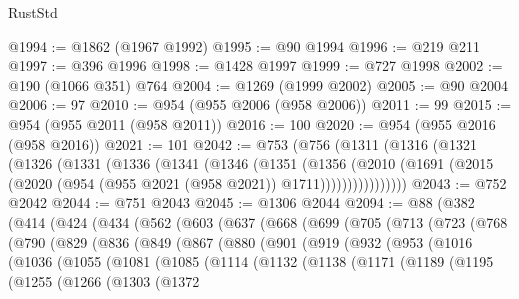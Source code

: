 \begin{lexlean}{RustStd}
\begin{coremodule}
{\begin{coremodule}
{{{{{{{{{{{{{{{{{{{{{{{{{{{{{{{{{{{{{{{{{{{{{{{{{{@1994 := @1862 (@1967 @1992)
@1995 := @90 @1994
@1996 := @219 @211
@1997 := @396 @1996
@1998 := @1428 @1997
@1999 := @727 @1998
@2002 := @190 (@1066 @351) @764
@2004 := @1269 (@1999 @2002)
@2005 := @90 @2004
@2006 := 97
@2010 := @954 (@955 @2006 (@958 @2006))
@2011 := 99
@2015 := @954 (@955 @2011 (@958 @2011))
@2016 := 100
@2020 := @954 (@955 @2016 (@958 @2016))
@2021 := 101
@2042 := @753
    (@756
      (@1311
        (@1316
          (@1321
            (@1326
              (@1331
                (@1336
                  (@1341
                    (@1346
                      (@1351
                        (@1356
                          (@2010
                            (@1691
                              (@2015 (@2020 (@954 (@955 @2021 (@958 @2021)) @1711))))))))))))))))
@2043 := @752 @2042
@2044 := @751 @2043
@2045 := @1306 @2044
@2094 := @88
    (@382
      (@414
        (@424
          (@434
            (@562
              (@603
                (@637
                  (@668
                    (@699
                      (@705
                        (@713
                          (@723
                            (@768
                              (@790
                                (@829
                                  (@836
                                    (@849
                                      (@867
                                        (@880
                                          (@901
                                            (@919
                                              (@932
                                                (@953
                                                  (@1016
                                                    (@1036
                                                      (@1055
                                                        (@1081
                                                          (@1085
                                                            (@1114
                                                              (@1132
                                                                (@1138
                                                                  (@1171
                                                                    (@1189
                                                                      (@1195
                                                                        (@1255
                                                                          (@1266
                                                                            (@1303
                                                                              (@1372
}}}}}}}}}}}}}}}}}}}}}}}}}}}}}}}}}}}}}}}}}}}}}}}}}}
\end{coremodule}}
\end{coremodule}
\end{lexlean}
